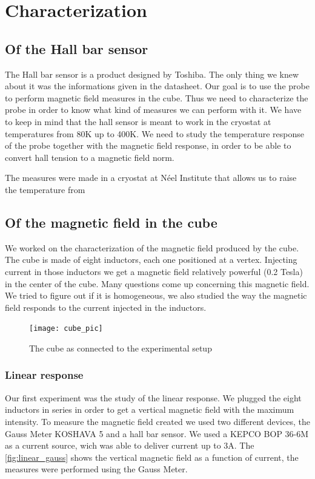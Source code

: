 \documentclass[journal]{IEEEtran}
\begin{document}
\section{Characterization}

\subsection{Of the Hall bar sensor}

The Hall bar sensor is a product designed by Toshiba. The only thing we knew about it was the informations given in the datasheet. Our goal is to use the probe to perform magnetic field measures in the cube. Thus we need to characterize the probe in order to know what kind of measures we can perform with it. We have to keep in mind that the hall sensor is meant to work in the cryostat at temperatures from 80K up to 400K. We need to study the temperature response of the probe together with the magnetic field response, in order to be able to convert hall tension to a magnetic field norm.

The measures were made in a cryostat at Néel Institute that allows us to raise the temperature from 

\subsection{Of the magnetic field in the cube}

We worked on the characterization of the magnetic field produced by the cube. The cube is made of eight inductors, each one positioned at a vertex. Injecting current in those inductors we get a magnetic field relatively powerful (0.2 Tesla) in the center of the cube. Many questions come up concerning this magnetic field. We tried to figure out if it is homogeneous, we also studied the way the magnetic field responds to the current injected in the inductors.

\begin{figure}[H]
\texttt{[image: cube\_pic]}
\caption{The cube as connected to the experimental setup}
\end{figure}

\subsubsection{Linear response}

Our first experiment was the study of the linear response. We plugged the eight inductors in series in order to get a vertical magnetic field with the maximum intensity. To measure the magnetic field created we used two different devices, the Gauss Meter KOSHAVA 5 and a hall bar sensor. We used a KEPCO BOP 36-6M as a current source, wich was able to deliver current up to 3A. The \figurename \ref{fig:linear_gauss} shows the vertical magnetic field as a function of current, the measures were performed using the Gauss Meter.
\end{document}

